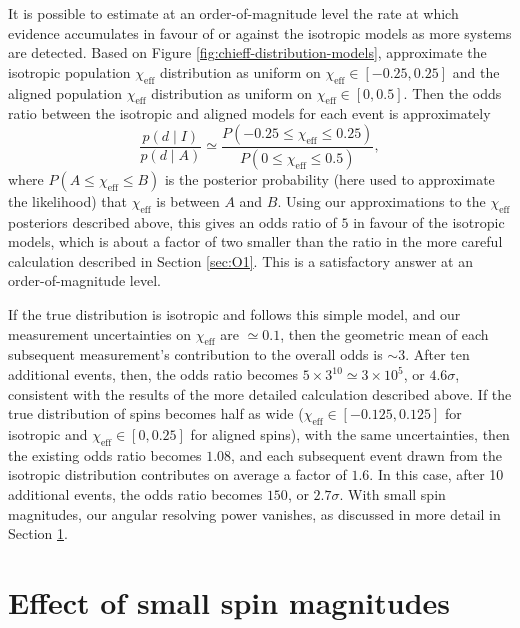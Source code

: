 \documentclass[modern,linenumbers]{aastex61}
\newcommand{\chieff}{\chi_\mathrm{eff}}
\begin{document}
It is possible to estimate at an order-of-magnitude level the rate at
which evidence accumulates in favour of or against the isotropic
models as more systems are detected.  Based on Figure
\ref{fig:chieff-distribution-models}, approximate the isotropic
population $\chieff$ distribution as uniform on
$\chieff \in \left[ -0.25, 0.25 \right]$ and the aligned population
$\chieff$ distribution as uniform on
$\chieff \in \left[0, 0.5\right]$.  Then the odds ratio between the
isotropic and aligned models for each event is approximately
\begin{equation}
  \label{eq:approx-odds}
  \frac{p\left( d \mid I \right)}{p\left( d \mid A \right)} \simeq
  \frac{P\left( -0.25 \leq \chieff \leq 0.25 \right)}{P\left( 0 \leq \chieff \leq 0.5 \right) },
\end{equation}
where $P\left( A \leq \chieff \leq B \right)$ is the posterior
probability (here used to approximate the likelihood) that $\chieff$
is between $A$ and $B$.  Using our approximations to the $\chieff$
posteriors described above, this gives an odds ratio of $5$ in favour
of the isotropic models, which is about a factor of two smaller than
the ratio in the more careful calculation described in Section
\ref{sec:O1}.  This is a satisfactory answer at an order-of-magnitude
level.

If the true distribution is isotropic and follows this simple model,
and our measurement uncertainties on $\chieff$ are $\simeq 0.1$, then
the geometric mean of each subsequent measurement's contribution to
the overall odds is $\sim 3$.  After ten additional events, then, the
odds ratio becomes $5 \times 3^{10} \simeq 3 \times 10^{5}$, or
$4.6 \sigma$, consistent with the results of the more detailed
calculation described above.  If the true distribution of spins
becomes half as wide ($\chieff \in [-0.125, 0.125]$ for isotropic and
$\chieff \in [0, 0.25]$ for aligned spins), with the same
uncertainties, then the existing odds ratio becomes $1.08$, and each
subsequent event drawn from the isotropic distribution contributes on
average a factor of $1.6$.  In this case, after 10 additional events,
the odds ratio becomes $150$, or $2.7\sigma$.  With small spin
magnitudes, our angular resolving power vanishes, as discussed in more
detail in Section \ref{sec:smallspins}.

\section{Effect of small spin magnitudes}
\label{sec:smallspins}
\end{document}
